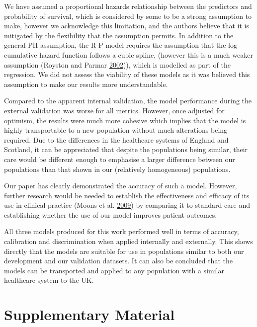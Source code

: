 \documentclass[
]{article}
\begin{document}
We have assumed a proportional hazards relationship between the predictors and probability of survival, which is considered by some to be a strong assumption to make, however we acknowledge this limitation, and the authors believe that it is mitigated by the flexibility that the assumption permits. In addition to the general PH assumption, the R-P model requires the assumption that the log cumulative hazard function follows a cubic spline, (however this is a much weaker assumption (Royston and Parmar \protect\hyperlink{ref-royston_flexible_2002}{2002})), which is modelled as part of the regression. We did not assess the viability of these models as it was believed this assumption to make our results more understandable.

Compared to the apparent internal validation, the model performance during the external validation was worse for all metrics. However, once adjusted for optimism, the results were much more cohesive which implies that the model is highly transportable to a new population without much alterations being required. Due to the differences in the healthcare systems of England and Scotland, it can be appreciated that despite the populations being similar, their care would be different enough to emphasise a larger difference between our populations than that shown in our (relatively homogeneous) populations.

Our paper has clearly demonstrated the accuracy of such a model. However, further research would be needed to establish the effectiveness and efficacy of its use in clinical practice (Moons et al. \protect\hyperlink{ref-moons_prognosis_2009-1}{2009}) by comparing it to standard care and establishing whether the use of our model improves patient outcomes.

All three models produced for this work performed well in terms of accuracy, calibration and discrimination when applied internally and externally. This shows directly that the models are suitable for use in populations similar to both our development and our validation datasets. It can also be concluded that the models can be transported and applied to any population with a similar healthcare system to the UK.

\hypertarget{appendix-appendices}{%
\appendix}


\hypertarget{chapdevpapersupp}{%
\section{Supplementary Material}\label{chapdevpapersupp}}
\end{document}
